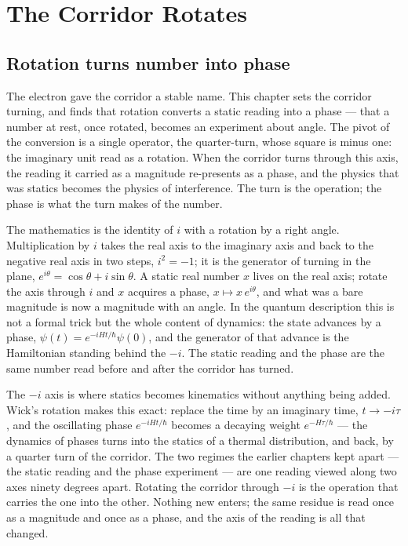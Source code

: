 \chapter{The Corridor Rotates}

\section{Rotation turns number into phase}

The electron gave the corridor a stable name. This chapter sets the corridor turning, and finds that rotation converts a
static reading into a phase --- that a number at rest, once rotated, becomes an experiment about angle. The pivot of the
conversion is a single operator, the quarter-turn, whose square is minus one: the imaginary unit read as a rotation. When the
corridor turns through this axis, the reading it carried as a magnitude re-presents as a phase, and the physics that was
statics becomes the physics of interference. The turn is the operation; the phase is what the turn makes of the number.

The mathematics is the identity of $i$ with a rotation by a right angle. Multiplication by $i$ takes the real axis to the
imaginary axis and back to the negative real axis in two steps, $i^2 = -1$; it is the generator of turning in the plane,
$e^{i\theta} = \cos\theta + i\sin\theta$. A static real number $x$ lives on the real axis; rotate the axis through $i$ and $x$
acquires a phase, $x \mapsto x\,e^{i\theta}$, and what was a bare magnitude is now a magnitude with an angle. In the quantum
description this is not a formal trick but the whole content of dynamics: the state advances by a phase, $\psi(t) =
e^{-iHt/\hbar}\psi(0)$, and the generator of that advance is the Hamiltonian standing behind the $-i$. The static reading and
the phase are the same number read before and after the corridor has turned.

The $-i$ axis is where statics becomes kinematics without anything being added. Wick's rotation makes this exact: replace the
time by an imaginary time, $t \to -i\tau$, and the oscillating phase $e^{-iHt/\hbar}$ becomes a decaying weight
$e^{-H\tau/\hbar}$ --- the dynamics of phases turns into the statics of a thermal distribution, and back, by a quarter turn
of the corridor. The two regimes the earlier chapters kept apart --- the static reading and the phase experiment --- are one
reading viewed along two axes ninety degrees apart. Rotating the corridor through $-i$ is the operation that carries the one
into the other. Nothing new enters; the same residue is read once as a magnitude and once as a phase, and the axis of the
reading is all that changed.

